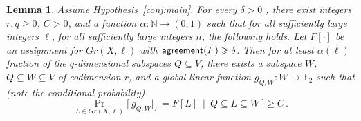 \documentclass[11pt]{article}
\numberwithin{equation}{section}
\newtheorem{lemma}[theorem]{Lemma}
\theoremstyle{definition}
\theoremstyle{plain}
\newcommand{\expref}[2]{\hyperref[#2]{#1~\ref{#2}}}
\newcommand\bProb[2]{{\Pr_{#1}\big[ {#2} \big]}}
\newcommand*\aconj[1]{\alpha{#1}}
\renewcommand\geq{\geqslant}
\renewcommand\ge{\geqslant}
\def\F{\mathbb{F}}
\def\agr{{\sf agreement}}
\begin{document}
\begin{lemma}\label{lemma:corr_main}
  Assume \expref{Hypothesis}{conj:main}. For every %
   $\delta > 0$ ,
  there exist integers $r,q \geq 0$, %
   $C > 0$, and a function $\alpha\colon\mathbb{N}\to(0,1)$ such that for
  all sufficiently large integers $\ell$, for all sufficiently large
  integers $n$, the following holds.  Let $F[\cdot]$ be an assignment
  for $Gr(X,\ell)$ with $\agr(F)\ge \delta$.  Then for at least
  $\aconj{(\ell)}$ fraction of the $q$-dimensional subspaces
  $Q \subseteq V$, there exists a subspace $W$,
  $Q \subseteq W \subseteq V$ of codimension $r$, and a global linear
  function $g_{Q,W}: W \to \F_2$ such that (note the conditional
  probability)
  \begin{equation*} %
  \bProb{L \in Gr(X, \ell)}{~g_{Q,W}|_L = F[L]  ~\mid ~ Q \subseteq L \subseteq W~}\geqslant C\,.
  \end{equation*}
\end{lemma}
\end{document}
